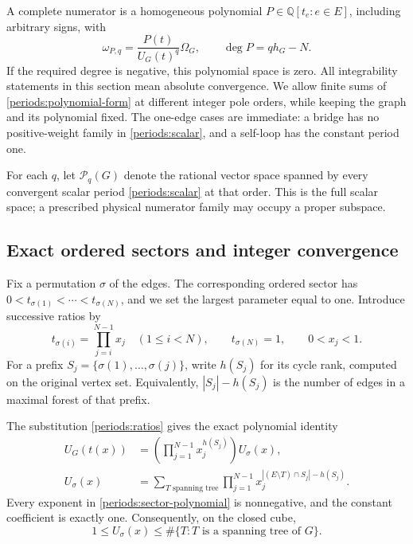 A complete numerator is a homogeneous polynomial $P\in\mathbb Q[t_e:e\in E]$,
including arbitrary signs, with
\begin{equation}
 \omega_{P,q}=\frac{P(t)}{U_G(t)^q}\Omega_G,
 \qquad \deg P=q h_G-N.
 \label{periods:polynomial-form}
\end{equation}
If the required degree is negative, this polynomial space is zero.  All
integrability statements in this section mean absolute convergence.  We
allow finite sums of \eqref{periods:polynomial-form} at different integer
pole orders, while keeping the graph and its polynomial fixed.  The
one-edge cases are immediate: a bridge has no positive-weight family in
\eqref{periods:scalar}, and a self-loop has the constant period one.

For each $q$, let $\mathcal P_q(G)$ denote the rational vector space
spanned by every convergent scalar period \eqref{periods:scalar} at that
order.  This is the full scalar space; a prescribed physical numerator
family may occupy a proper subspace.

\subsection{Exact ordered sectors and integer convergence}
\label{periods:hepp}

Fix a permutation $\sigma$ of the edges.  The corresponding ordered
sector has $0<t_{\sigma(1)}<\cdots<t_{\sigma(N)}$, and we set the largest
parameter equal to one.  Introduce successive ratios by
\begin{equation}
 t_{\sigma(i)}=\prod_{j=i}^{N-1}x_j\quad(1\le i<N),
 \qquad t_{\sigma(N)}=1,
 \qquad 0<x_j<1.
 \label{periods:ratios}
\end{equation}
For a prefix $S_j=\{\sigma(1),\ldots,\sigma(j)\}$, write $h(S_j)$ for
its cycle rank, computed on the original vertex set.  Equivalently,
$|S_j|-h(S_j)$ is the number of edges in a maximal forest of that prefix.

\begin{lemma}
\label{periods:greedy}
The substitution \eqref{periods:ratios} gives the exact polynomial identity
\begin{align}
 U_G(t(x))&=\left(\prod_{j=1}^{N-1}x_j^{h(S_j)}\right)U_\sigma(x),
 \label{periods:factorization}\\
 U_\sigma(x)&=
 \sum_{T\text{ spanning tree}}
 \prod_{j=1}^{N-1}x_j^{|(E\setminus T)\cap S_j|-h(S_j)}.
 \label{periods:sector-polynomial}
\end{align}
Every exponent in \eqref{periods:sector-polynomial} is nonnegative, and
the constant coefficient is exactly one.  Consequently, on the closed cube,
\begin{equation}
 1\le U_\sigma(x)\le \#\{T:T\text{ is a spanning tree of }G\}.
 \label{periods:positive-denominator}
\end{equation}
\end{lemma}

